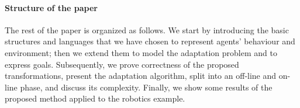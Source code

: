 %
%
%

\paragraph{Structure of the paper} %
\label{par:structure_of_the_paper}
The rest of the paper is organized as follows. We start by introducing the basic structures and languages that we have chosen
to represent agents' behaviour and environment; then we extend them to model the adaptation problem and  
to express goals. Subsequently, we prove correctness of the proposed transformations, present the adaptation algorithm, split into an off-line and on-line phase, and discuss its complexity. Finally, we show some results of the proposed method applied to the robotics example.


